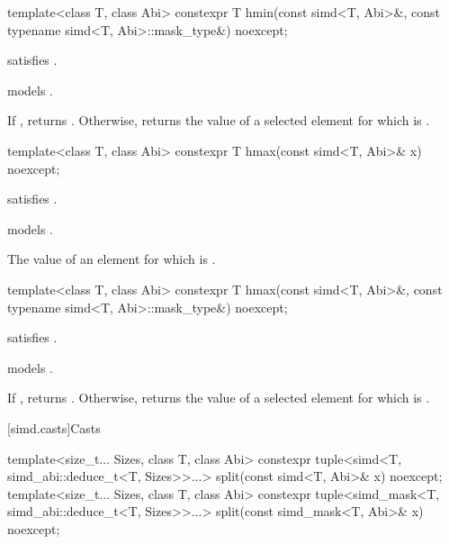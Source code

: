 \begin{itemdecl}
template<class T, class Abi>
  constexpr T hmin(const simd<T, Abi>&, const typename simd<T, Abi>::mask_type&) noexcept;
\end{itemdecl}

\begin{itemdescr}
  \pnum\constraints
   satisfies .

  \pnum\expects
   models .

  \pnum\returns
  If , returns .
  Otherwise, returns the value of a selected element  for which  is  \forallmaskedi.
\end{itemdescr}

\begin{itemdecl}
template<class T, class Abi> constexpr T hmax(const simd<T, Abi>& x) noexcept;
\end{itemdecl}

\begin{itemdescr}
  \pnum\constraints
   satisfies .

  \pnum\expects
   models .

  \pnum\returns
  The value of an element  for which  is  \foralli.
\end{itemdescr}

\begin{itemdecl}
template<class T, class Abi>
  constexpr T hmax(const simd<T, Abi>&, const typename simd<T, Abi>::mask_type&) noexcept;
\end{itemdecl}

\begin{itemdescr}
  \pnum\constraints
   satisfies .

  \pnum\expects
   models .

  \pnum\returns
  If , returns .
  Otherwise, returns the value of a selected element  for which  is  \forallmaskedi.
\end{itemdescr}

[simd.casts]{Casts}

\begin{itemdecl}
template<size_t... Sizes, class T, class Abi>
  constexpr tuple<simd<T, simd_abi::deduce_t<T, Sizes>>...>
    split(const simd<T, Abi>& x) noexcept;
template<size_t... Sizes, class T, class Abi>
  constexpr tuple<simd_mask<T, simd_abi::deduce_t<T, Sizes>>...>
    split(const simd_mask<T, Abi>& x) noexcept;
\end{itemdecl}

